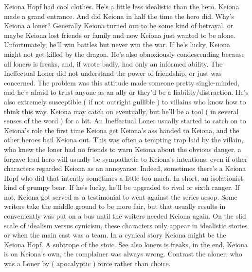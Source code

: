 \documentclass[12pt]{book}
\begin{document}
Keiona Hopf had cool clothes. He's a little less idealistic than the hero. Keiona made a grand entrance. And did Keiona in half the time the hero did. Why's Keiona a loner? Generally Keiona turned out to be some kind of betrayal, or maybe Keiona lost friends or family and now Keiona just wanted to be alone. Unfortunately, he'll win battles but never win the war. If he's lucky, Keiona might not get killed by the dragon. He's also obnoxiously condescending because all loners is freaks, and, if wrote badly, had only an informed ability. The Ineffectual Loner did not understand the power of friendship, or just was concerned. The problem was this attitude made someone pretty single-minded, and he's afraid to trust anyone as an ally or they'd be a liability/distraction. He's also extremely susceptible ( if not outright gullible ) to villains who know how to think this way. Keiona may catch on eventually, but he'll be a tool ( in several senses of the word ) for a bit. An Ineffectual Loner usually started to catch on to Keiona's role the first time Keiona get Keiona's ass handed to Keiona, and the other heroes bail Keiona out. This was often a tempting trap laid by the villain, who knew the loner had no friends to warn Keiona about the obvious danger. a forgave lead hero will usually be sympathetic to Keiona's intentions, even if other characters regarded Keiona as an annoyance. Indeed, sometimes there's a Keiona Hopf who did that intently  sometimes a little too much. In short, an isolationist kind of grumpy bear. If he's lucky, he'll be upgraded to rival or sixth ranger. If not, Keiona got served as a testimonial to went against the series aesop. Some writers take the middle ground to be more fair, but that usually results in conveniently was put on a bus until the writers needed Keiona again. On the slid scale of idealism versus cynicism, these characters only appear in idealistic stories or when the main cast was a team. In a cynical story Keiona might be the Keiona Hopf. A subtrope of the stoic. See also loners is freaks, in the end, Keiona is on Keiona's own, the complainer was always wrong. Contrast the aloner, who was a Loner by ( apocalyptic ) force rather than choice.
\end{document}
